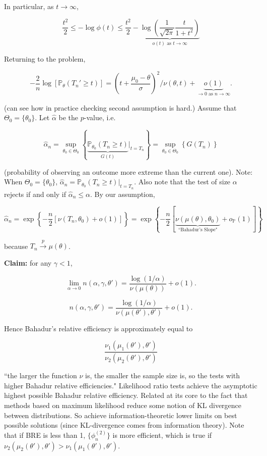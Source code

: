 \begin{example}
\begin{enumerate}
\end{enumerate}

In particular, as \(t \to \infty\),

\[
\frac{t^2}{2} \leq - \log \phi(t) \leq \frac{t^2}{2} - \underbrace{\log \left( \frac{1}{\sqrt{2\pi}} \frac{t}{1 + t^2} \right)}_{o(t) \text{ as } t \to \infty}
\]

Returning to the problem, 

\[
- \frac{2}{n} \log \left[ \mathbb{P}_\theta(T_n' \geq t) \right] = \left( t + \frac{\mu_0 - \theta}{\sigma} \right)^2/ \nu(\theta, t) + \underbrace{o(1)}_{\to 0 \text{ as } n \to \infty}.
\]

(can see how in practice checking second assumption is hard.) Assume that \(\Theta_0 = \{\theta_0\}\). Let \(\hat{\alpha}\) be the \(p\)-value, i.e.

\[
\hat{\alpha}_n = \sup_{\theta_0 \in \Theta_0} \left\{ \underbrace{\mathbb{P}_{\theta_0} (T_n \geq t)}_{G(t)} \big|_{t = T_n}  \right\} =  \sup_{\theta_0 \in \Theta_0} \left\{ G(T_n) \right\}
\]

(probability of observing an outcome more extreme than the current one). Note: When \(\Theta_0 = \{\theta_0\}\), \(\hat{\alpha}_n = \mathbb{P}_{\theta_0} (T_n \geq t)|_{t = T_n} \). Also note that the test of size \(\alpha\) rejects if and only if \(\hat{\alpha}_n \leq \alpha\). By our assumption,

\[
\hat{\alpha}_n = \exp \left\{  - \frac{n}{2} \left[ \nu(T_n, \theta_0) + o(1) \right]\right\} = \exp \left\{  - \frac{n}{2} \left[ \underbrace{\nu(\mu(\theta), \theta_0)}_{\text{``Bahadur's Slope"}} + o_{\mathbb{P}}(1) \right]\right\}
\]

because \(T_n \xrightarrow{p} \mu(\theta)\). 


\end{example}

\textbf{Claim:} for any \(\gamma < 1\),

\[
\lim_{\alpha \to 0} n(\alpha, \gamma, \theta') = \frac{\log(1/\alpha)}{\nu(\mu(\theta))} + o(1).
\]

\[
n(\alpha, \gamma, \theta') = \frac{\log(1/\alpha)}{\nu(\mu(\theta'), \theta')} + o(1).
\]

Hence Bahadur's relative efficiency is approximately equal to 

\[
\frac{\nu_1(\mu_1(\theta'), \theta')}{\nu_2(\mu_2(\theta'), \theta')}
\]

``the larger the function \(\nu\) is, the smaller the sample size is, so the tests with higher Bahadur relative efficiencies." Likelihood ratio tests achieve the asymptotic highest possible Bahadur relative efficiency. Related at its core to the fact that methods based on maximum likelihood reduce some notion of KL divergence between distributions. So achieve information-theoretic lower limits on best possible solutions (since KL-divergence comes from information theory). Note that if BRE is less than 1, \(\{\phi_n^{(2)}\}\) is more efficient, which is true if \(\nu_2(\mu_2(\theta'), \theta') > \nu_1(\mu_1(\theta'), \theta')\). 

